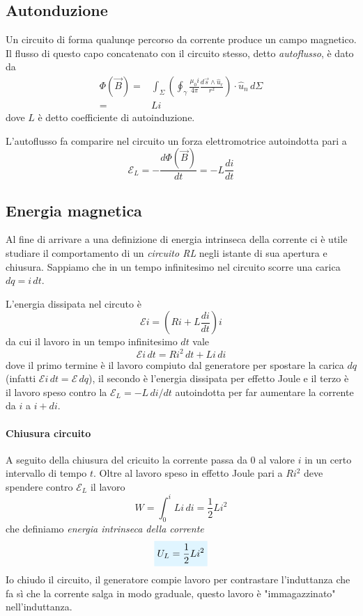 \documentclass[x11names]{report}
\newcommand{\viola}[1]{%
	\colorbox{myblue}{$\displaystyle #1$}
}
\begin{document}
\subsection{Autonduzione}
Un circuito di forma qualunqe percorso da corrente produce un campo magnetico. Il flusso di questo capo concatenato con il circuito stesso, detto \textit{autoflusso}, è dato da 
\begin{align*}
	\Phi(\vec{B}) =& \int_\Sigma \left(\oint_\gamma \frac{\mu_0 i}{4\pi}\frac{d\vec{s}\wedge\hat{u}_r}{r^2}\right) \cdot \hat{u}_n \, d\Sigma \\
	=& Li
\end{align*}
dove \(L\) è detto coefficiente di autoinduzione. 

L'autoflusso fa comparire nel circuito un forza elettromotrice autoindotta pari a 
\[
\mathcal{E}_L= - \frac{d\Phi(\vec{B})}{dt} = - L\frac{di}{dt}
\]

\subsection{Energia magnetica}
Al fine di arrivare a una definizione di energia intrinseca della corrente ci è utile studiare il comportamento di un \textit{circuito RL} negli istante di sua apertura e chiusura. Sappiamo che in un tempo infinitesimo nel circuito scorre una carica \(dq = i \, dt\).

L'energia dissipata nel circuto è
\[
\mathcal{E}i = \left(Ri + L\frac{di}{dt}\right)i
\]
da cui il lavoro in un tempo infinitesimo \(dt\) vale
\[
\mathcal{E}i \, dt = Ri^2 \, dt + Li \, di
\]
dove il primo termine è il lavoro compiuto dal generatore per spostare la carica \(dq\) (infatti \(\mathcal{E}i \, dt  = \mathcal{E} \, dq \)), il secondo è l'energia dissipata per effetto Joule e il terzo è il lavoro speso contro la \(\mathcal{E}_L = -L \, di/dt\) autoindotta per far aumentare la corrente da \(i\) a \(i + di\).

\paragraph{Chiusura circuito} A seguito della chiusura del cricuito la corrente passa da \(0\) al valore \(i\) in un certo intervallo di tempo \(t\). Oltre al lavoro speso in effetto Joule pari a \(Ri^2\) deve spendere contro \(\mathcal{E}_L\) il lavoro
\[
W = \int_{0}^{i}Li \, di = \frac{1}{2}Li^2
\]
che definiamo \textit{energia intrinseca della corrente}
\begin{equation}
	\viola{U_L = \frac{1}{2}Li^2}
\end{equation}
Io chiudo il circuito, il generatore compie lavoro per contrastare l'induttanza che fa sì che la corrente salga in modo graduale, questo lavoro è "immagazzinato" nell'induttanza.
\end{document}
